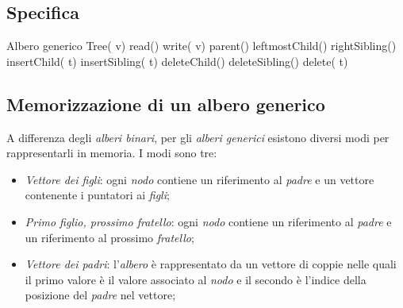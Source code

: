 \subsection{Specifica}
\begin{code}{Albero generico}
    Tree(  v)
    \nl{}
     read()
    \nl{}
    write( v)
    \nl{}
     parent()
    \nl{}
     leftmostChild()
    \nl{}
     rightSibling()
    \nl{}
    insertChild( t)
    \nl{}
    insertSibling( t)
    \nl{}
    deleteChild()
    \nl{}
    deleteSibling()
    \nl{}
    delete( t)
\end{code}

\subsection{Memorizzazione di un albero generico}
A differenza degli \emph{alberi binari}, per gli \emph{alberi generici} esistono
diversi modi per rappresentarli in memoria. I modi sono tre:
\begin{itemize}
    \item \emph{Vettore dei figli}: ogni \emph{nodo} contiene un riferimento al
    \emph{padre} e un vettore contenente i puntatori ai \emph{figli};
    \item \emph{Primo figlio, prossimo fratello}: ogni \emph{nodo} contiene un
    riferimento al \emph{padre} e un riferimento al prossimo \emph{fratello};
    \item \emph{Vettore dei padri}: l'\emph{albero} è rappresentato da un
    vettore di coppie nelle quali il primo valore è il valore associato al
    \emph{nodo} e il secondo è l'indice della posizione del \emph{padre} nel
    vettore;
\end{itemize}

